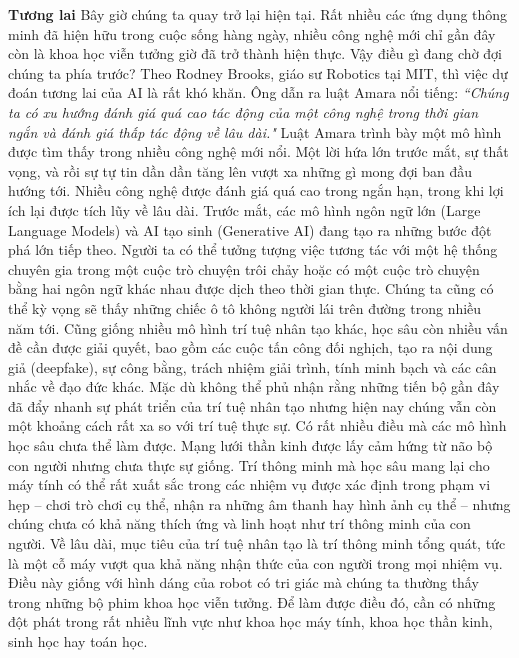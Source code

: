\begin{multicols}{2}
	\vskip 0.1cm
	\textbf{\color{cackithi}Tương lai}
	\vskip 0.1cm
	Bây giờ chúng ta quay trở lại hiện tại. Rất nhiều các ứng dụng thông minh đã hiện hữu trong cuộc sống hàng ngày, nhiều công nghệ mới chỉ gần đây còn là khoa học viễn tưởng giờ đã trở thành hiện thực. Vậy điều gì đang chờ đợi chúng ta phía trước?
	\vskip 0.1cm
	Theo Rodney Brooks, giáo sư Robotics tại MIT, thì việc dự đoán tương lai của AI là rất khó khăn. Ông dẫn ra luật Amara nổi tiếng:
	\textit{``Chúng ta có xu hướng đánh giá quá cao tác động của một công nghệ trong thời gian ngắn và đánh giá thấp tác động về lâu dài."}
	Luật Amara trình bày một mô hình được tìm thấy trong nhiều công nghệ mới nổi. Một lời hứa lớn trước mắt, sự thất vọng, và rồi sự tự tin dần dần tăng lên vượt xa những gì mong đợi ban đầu hướng tới. Nhiều công nghệ được đánh giá quá cao trong ngắn hạn, trong khi lợi ích lại được tích lũy về lâu dài. 
	\vskip 0.1cm
	Trước mắt, các mô hình ngôn ngữ lớn (Large Language Models) và AI tạo sinh (Generative AI) đang tạo ra những bước đột phá lớn tiếp theo. Người ta có thể tưởng tượng việc tương tác với một hệ thống chuyên gia trong một cuộc trò chuyện trôi chảy hoặc có một cuộc trò chuyện bằng hai ngôn ngữ khác nhau được dịch theo thời gian thực. Chúng ta cũng có thể kỳ vọng sẽ thấy những chiếc ô tô không người lái trên đường trong nhiều năm tới.
	\vskip 0.1cm
	Cũng giống nhiều mô hình trí tuệ nhân tạo khác, học sâu còn nhiều vấn đề cần được giải quyết, bao gồm các cuộc tấn công đối nghịch, tạo ra nội dung giả (deepfake), sự công bằng, trách nhiệm giải trình, tính minh bạch và các cân nhắc về đạo đức khác.
	\vskip 0.1cm
	Mặc dù không thể phủ nhận rằng những tiến bộ gần đây đã đẩy nhanh sự phát triển của trí tuệ nhân tạo nhưng hiện nay chúng vẫn còn một khoảng cách rất xa so với trí tuệ thực sự. Có rất nhiều điều mà các mô hình học sâu chưa thể làm được. Mạng lưới thần kinh được lấy cảm hứng từ não bộ con người nhưng chưa thực sự giống. Trí thông minh mà học sâu mang lại cho máy tính có thể rất xuất sắc trong các nhiệm vụ được xác định trong phạm vi hẹp -- chơi trò chơi cụ thể, nhận ra những âm thanh hay hình ảnh cụ thể  -- nhưng chúng chưa có khả năng thích ứng và linh hoạt như trí thông minh của con người. Về lâu dài, mục tiêu của trí tuệ nhân tạo là trí thông minh tổng quát, tức là một cỗ máy vượt qua khả năng nhận thức của con người trong mọi nhiệm vụ. Điều này giống với hình dáng của robot có tri giác mà chúng ta thường thấy trong những bộ phim khoa học viễn tưởng. Để làm được điều đó, cần có những đột phát trong rất nhiều lĩnh vực như khoa học máy tính, khoa học thần kinh, sinh học hay toán học. 

\end{multicols}

